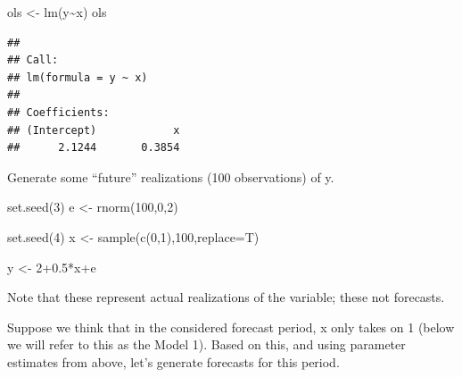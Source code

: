 \documentclass[
  12pt,
  oneside]{book}
\newenvironment{Shaded}{\begin{snugshade}}{\end{snugshade}}
\newcommand{\AttributeTok}[1]{\textcolor[rgb]{0.77,0.63,0.00}{#1}}
\newcommand{\DecValTok}[1]{\textcolor[rgb]{0.00,0.00,0.81}{#1}}
\newcommand{\FloatTok}[1]{\textcolor[rgb]{0.00,0.00,0.81}{#1}}
\newcommand{\FunctionTok}[1]{\textcolor[rgb]{0.00,0.00,0.00}{#1}}
\newcommand{\NormalTok}[1]{#1}
\newcommand{\OtherTok}[1]{\textcolor[rgb]{0.56,0.35,0.01}{#1}}
\newcommand{\SpecialCharTok}[1]{\textcolor[rgb]{0.00,0.00,0.00}{#1}}
\begin{document}
\begin{Shaded}
\begin{Highlighting}[]
\NormalTok{ols }\OtherTok{\textless{}{-}} \FunctionTok{lm}\NormalTok{(y}\SpecialCharTok{\textasciitilde{}}\NormalTok{x)}
\NormalTok{ols}
\end{Highlighting}
\end{Shaded}

\begin{verbatim}
## 
## Call:
## lm(formula = y ~ x)
## 
## Coefficients:
## (Intercept)            x  
##      2.1244       0.3854
\end{verbatim}

Generate some ``future'' realizations (100 observations) of y.

\begin{Shaded}
\begin{Highlighting}[]
\FunctionTok{set.seed}\NormalTok{(}\DecValTok{3}\NormalTok{)}
\NormalTok{e }\OtherTok{\textless{}{-}} \FunctionTok{rnorm}\NormalTok{(}\DecValTok{100}\NormalTok{,}\DecValTok{0}\NormalTok{,}\DecValTok{2}\NormalTok{)}

\FunctionTok{set.seed}\NormalTok{(}\DecValTok{4}\NormalTok{)}
\NormalTok{x }\OtherTok{\textless{}{-}} \FunctionTok{sample}\NormalTok{(}\FunctionTok{c}\NormalTok{(}\DecValTok{0}\NormalTok{,}\DecValTok{1}\NormalTok{),}\DecValTok{100}\NormalTok{,}\AttributeTok{replace=}\NormalTok{T)}

\NormalTok{y }\OtherTok{\textless{}{-}} \DecValTok{2}\FloatTok{+0.5}\SpecialCharTok{*}\NormalTok{x}\SpecialCharTok{+}\NormalTok{e}
\end{Highlighting}
\end{Shaded}

Note that these represent actual realizations of the variable; these not forecasts.

Suppose we think that in the considered forecast period, x only takes on 1 (below we will refer to this as the Model 1). Based on this, and using parameter estimates from above, let's generate forecasts for this period.

\begin{Shaded}
\end{Shaded}
\end{document}
